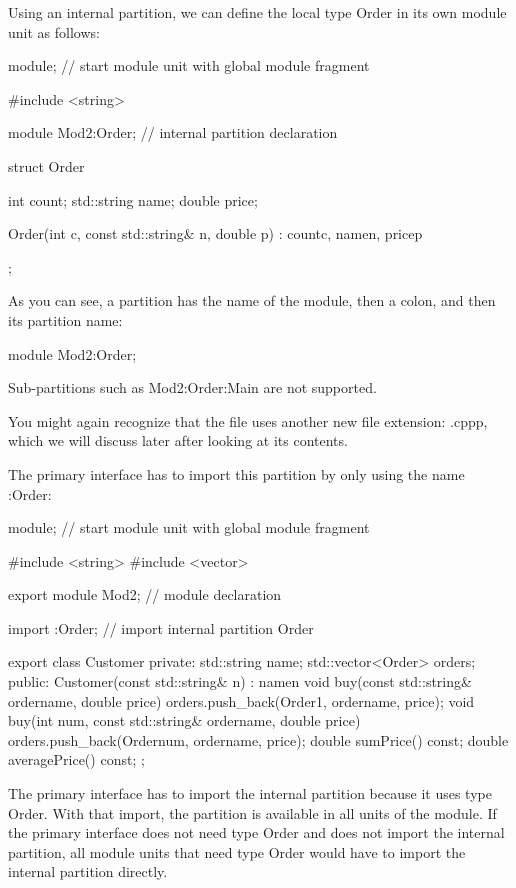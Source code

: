 Using an internal partition, we can define the local type Order in its own module unit as follows:


\begin{cpp}
module; // start module unit with global module fragment

#include <string>

module Mod2:Order; // internal partition declaration

struct Order {
	int count;
	std::string name;
	double price;
	
	Order(int c, const std::string& n, double p)
		: count{c}, name{n}, price{p} {
	}
};
\end{cpp}

As you can see, a partition has the name of the module, then a colon, and then its partition name:

\begin{cpp}
module Mod2:Order;
\end{cpp}

Sub-partitions such as Mod2:Order:Main are not supported.

You might again recognize that the file uses another new file extension: .cppp, which we will discuss later after looking at its contents.

The primary interface has to import this partition by only using the name :Order:


\begin{cpp}
module; // start module unit with global module fragment

#include <string>
#include <vector>

export module Mod2; // module declaration

import :Order; // import internal partition Order

export class Customer {
private:
	std::string name;
	std::vector<Order> orders;
public:
	Customer(const std::string& n)
	: name{n} {
	}
	void buy(const std::string& ordername, double price) {
		orders.push_back(Order{1, ordername, price});
	}
	void buy(int num, const std::string& ordername, double price) {
		orders.push_back(Order{num, ordername, price});
	}
	double sumPrice() const;
	double averagePrice() const;
};
\end{cpp}

The primary interface has to import the internal partition because it uses type Order. With that import, the partition is available in all units of the module. If the primary interface does not need type Order and does not import the internal partition, all module units that need type Order would have to import the internal partition directly.

